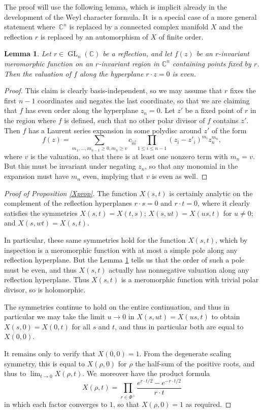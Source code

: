 \documentclass[JEP,XML,SOM,Unicode,NoFloatCountersInSection,published]{cedram}
\newtheorem{lem}[equation]{Lemma}
\theoremstyle{definition}
\newcommand{\C}{\mathbb{C}}
\DeclareMathOperator{\GL}{GL}
\begin{document}
The proof will use the following lemma, which is implicit already in the development of the Weyl character formula. It~is a special case of a more general statement where~$\C^n$ is replaced by a connected complex manifold $X$ and the reflection $r$ is replaced by an automorphism of $X$ of finite order.

\begin{lem} \label{value}
Let $r\in \GL_n(\C)$ be a reflection, and let $f(z)$ be an $r$-invariant meromorphic function on an $r$-invariant region in $\C^n$
containing points fixed by $r$. Then the valuation of $f$ along the hyperplane $r\cdot z=0$ is even.
\end{lem}

\begin{proof}
This claim is clearly basis-independent, so we may assume that $r$ fixes the first $n-1$ coordinates and negates the last coordinate, so that we are claiming that $f$ has even order along the hyperplane $z_n=0$.
Let $z'$ be a fixed point of $r$ in the region where $f$ is defined, such that no other polar divisor of $f$ contains $z'$. Then $f$ has a Laurent series expansion in some polydisc around $z'$ of the form
\[
f(z) = \sum_{m_1,\dots,m_{n-1}\ge 0,m_n\ge v} c_{\vec{m}} \prod_{1\le i\le n-1} (z_i-z'_i)^{m_i} z_n^{m_n},
\]
where $v$ is the valuation, so that there is at least one nonzero term with $m_n=v$. But this must be invariant under negating $z_n$, so that any monomial in the expansion must have $m_n$ even, implying that $v$ is even as well.
\end{proof}

\begin{proof}[Proof of Proposition \ref{Xprop}]
The function $X(s,t)$ is certainly analytic on the complement of the
reflection hyperplanes $r\cdot s = 0$ and $r\cdot t = 0$, where it clearly
satisfies the symmetries $X(s,t)=X(t,s)$; $X(s,ut)=X(us,t)$ for $u\ne 0$;
and $X(s,wt)=X(s,t)$.

In particular, these same symmetries hold for the function $X(s,t)$, which
by inspection is a meromorphic function with at most a simple pole along
any reflection hyperplane. But the Lemma \ref{value} tells us that the order of such a pole must be even, and thus $X(s,t)$ actually has nonnegative valuation along any reflection hyperplane. Thus $X(s,t)$ is a meromorphic function with trivial polar divisor, so is holomorphic.

The symmetries continue to hold on the entire continuation, and thus in
particular we may take the limit $u\to 0$ in $X(s,ut)=X(us,t)$ to obtain
$X(s,0)=X(0,t)$ for all $s$ and $t$, and thus in particular both are equal to
$X(0,0)$.

It remains only to verify that $X(0,0)=1$. From the degenerate scaling
symmetry, this is equal to $X(\rho,0)$ for $\rho$ the half-sum of the positive roots, and thus to $\lim_{t\to 0}
X(\rho,t)$. We~moreover have the product formula
\[
X(\rho,t) =
\prod_{r\in \Phi^+} \frac{e^{r\cdot t/2}-e^{-r\cdot t/2}}{r\cdot t}
\]
in which each factor converges to $1$, so that $X(\rho,0)=1$ as required.
\end{proof}
\end{document}
